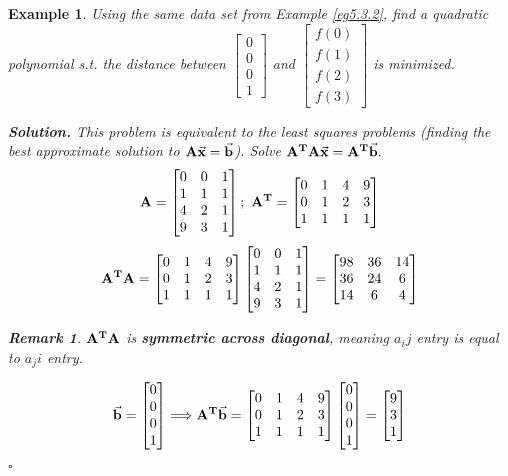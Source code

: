 \documentclass[12pt, a4paper]{article}
\newtheorem{eg}{Example}[subsection]
\newtheorem*{rmk}{\indent Remark}
\newenvironment*{sol}{\par\indent\textbf{\textit{Solution. }}}{\hfill{$\square$}\par}
\def\T{{\vb{T}}}
\def\vecx{\va{x}}
\def\vecb{\va{b}}
\def\matrixA{\vb{A}}
\begin{document}
\begin{eg}
	Using the same data set from Example \ref{eg5.3.2}, find a quadratic polynomial \emph{s.t.} the distance between $\begin{bmatrix}0\\0\\0\\1\end{bmatrix}$ and $\begin{bmatrix}f(0)\\f(1)\\f(2)\\f(3)\end{bmatrix}$ is minimized. \\
	\begin{sol}
		This problem is equivalent to the least squares problems (finding the best approximate solution to $\matrixA\vecx=\vecb$). Solve $\matrixA^\T\matrixA\vecx=\matrixA^\T\vecb.$
		\[\matrixA=\begin{bmatrix}0&0&1\\1&1&1\\4&2&1\\9&3&1\end{bmatrix};\ \matrixA^\T=\begin{bmatrix}0&1&4&9\\0&1&2&3\\1&1&1&1\end{bmatrix}\]
		\[\matrixA^\T\matrixA=\begin{bmatrix}0&1&4&9\\0&1&2&3\\1&1&1&1\end{bmatrix}\begin{bmatrix}0&0&1\\1&1&1\\4&2&1\\9&3&1\end{bmatrix}=\begin{bmatrix}98&36&14\\36&24&6\\14&6&4\end{bmatrix}\]
		\begin{rmk}
			$\matrixA^\T\matrixA$ is \textbf{symmetric across diagonal}, meaning $a_ij$ entry is equal to $a_ji$ entry. 
		\end{rmk}
		\[\vecb=\begin{bmatrix}0\\0\\0\\1\end{bmatrix}\Longrightarrow\matrixA^\T\vecb=\begin{bmatrix}0&1&4&9\\0&1&2&3\\1&1&1&1\end{bmatrix}\begin{bmatrix}0\\0\\0\\1\end{bmatrix}=\begin{bmatrix}9\\3\\1\end{bmatrix}\]

\end{sol}
\end{eg}
\end{document}

